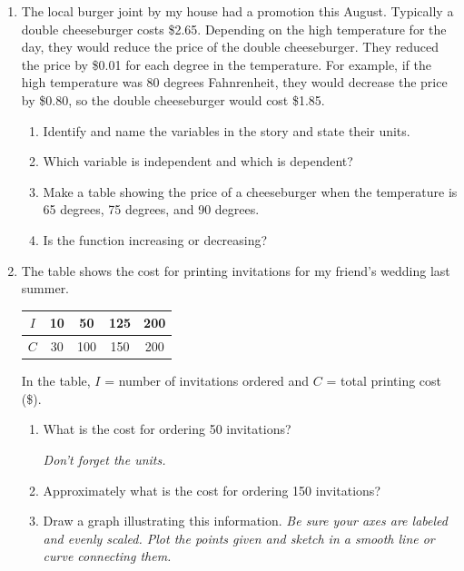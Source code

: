 \documentclass[12pt]{article}
\begin{document}
\begin{enumerate}


\item The local burger joint by my house had a promotion this August.  Typically a double cheeseburger costs \$2.65.  Depending on the high temperature for the day, they would reduce the price of the double cheeseburger.  They reduced the price by \$0.01 for each degree in the temperature. For example, if the high temperature was 80 degrees Fahnrenheit, they would decrease the price by \$0.80, so the double cheeseburger would cost \$1.85.

\begin{enumerate}
\item Identify and name the variables in the story and state their units.
\vfill
\item Which variable is independent and which is dependent?
\vfill
\item Make a table showing the price of a cheeseburger when the temperature is 65 degrees, 75 degrees, and 90 degrees.
\vfill
\vfill
\vfill
\item Is the function increasing or decreasing?
\vfill
\end{enumerate}

\newpage

\item The table shows the cost for printing invitations for my friend's wedding last summer.  

\begin{center}
\begin{tabular} {|c|c|c|c|c|} \hline
$I$ & 10 & 50 & 125 & 200 \\ \hline
$C$ & 30 & 100 & 150 & 200 \\ \hline
\end{tabular}
\end{center}

In the table, $I$ = number of invitations ordered and $C$ = total printing cost  (\$).

\begin{enumerate}
\item What is the cost for ordering 50 invitations?

\emph{Don't forget the units.}
\vfill
\item Approximately what is the cost for ordering 150 invitations?
\vfill
\item Draw a graph illustrating this information.  \emph{Be sure your axes are labeled and evenly scaled.  Plot the points given and sketch in a smooth line or curve connecting them.}


\end{enumerate}
\end{enumerate}
\end{document}
